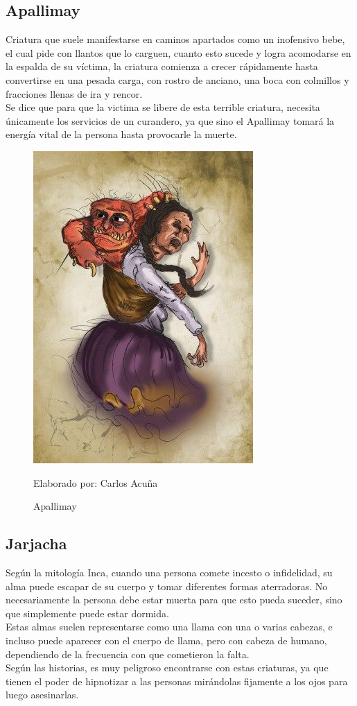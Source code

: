 \documentclass[a4paper, openright, 12pt]{report}
\begin{document}
\subsection*{Apallimay}
\justify
Criatura que suele manifestarse en caminos apartados como un inofensivo bebe, el cual pide con llantos que lo carguen, cuanto esto sucede y logra acomodarse en la espalda de su víctima, la criatura comienza a crecer rápidamente hasta convertirse en una pesada carga, con rostro de anciano, una boca con colmillos y fracciones llenas de ira y rencor.\\
Se dice que para que la victima se libere de esta terrible criatura, necesita únicamente los servicios de un curandero, ya que sino el Apallimay tomará la energía vital de la persona hasta provocarle la muerte.\cite{morel1987diccionario} 

\begin{figure}[h]
\captionsetup{justification=centering,margin=2cm}
\includegraphics[scale=0.5]{h12}
\centering
\caption{Apallimay}
Elaborado por: Carlos Acuña
\label{fig:h12}
\end{figure}

\subsection*{Jarjacha}
\justify
Según la mitología Inca, cuando una persona comete incesto o infidelidad, su alma puede escapar de su cuerpo y tomar diferentes formas aterradoras. No necesariamente la persona debe estar muerta para que esto pueda suceder, sino que simplemente puede estar dormida.\\
Estas almas suelen representarse como una llama con una o varias cabezas, e incluso puede aparecer con el cuerpo de llama, pero con cabeza de humano, dependiendo de la frecuencia con que cometieron la falta.\\
Según las historias, es muy peligroso encontrarse con estas criaturas, ya que tienen el poder de hipnotizar a las personas mirándolas fijamente a los ojos para luego asesinarlas.\cite{morel1987diccionario}
\end{document}
